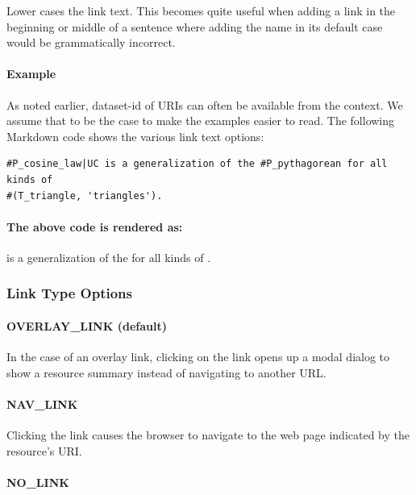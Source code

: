 \documentclass[a4paper]{article}
\begin{document}
Lower cases the link text. This becomes quite useful when adding a link in the beginning or middle of a sentence where adding the name in its default case would be grammatically incorrect.

\paragraph{Example}
As noted earlier, dataset-id of URIs can often be available from the context. We assume that to be the case to make the examples easier to read.
The following Markdown code shows the various link text options:

\begin{verbatim}
#P_cosine_law|UC is a generalization of the #P_pythagorean for all kinds of
#(T_triangle, 'triangles').
\end{verbatim}

\paragraph{The above code is rendered as:}
\begin{mdframed}
 is a generalization of the  for all kinds of .
\end{mdframed}

\subsubsection{Link Type Options}

\paragraph{OVERLAY\_LINK (default)}

In the case of an overlay link, clicking on the link opens up a modal dialog to show a resource summary instead of navigating to another URL.


\paragraph{NAV\_LINK}

Clicking the link causes the browser to navigate to the web page indicated by the resource's URI.

\paragraph{NO\_LINK}
\end{document}

